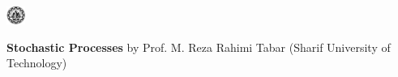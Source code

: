 \documentclass[9pt, purple]{./template/cv} %
\begin{document}
\begin{minipage}{\linewidth}
\begin{minipage}[t]{\linewidth}
    \end{minipage}

    \vspace{0.3cm}
    
    \begin{minipage}[t]{\linewidth}
    
        \begin{minipage}{1cm}
            \vspace{-\baselineskip}
            \includegraphics[width=6mm]{img/sharif}\centering
        \end{minipage}
        \begin{minipage}{0.8\linewidth}
            \vspace{-\baselineskip}
            \textcolor{text!85}{\textbf{Stochastic Processes} \space \pipe \space by Prof. M. Reza Rahimi Tabar (Sharif University of Technology)}
        \end{minipage}
    
    \end{minipage}
    
\end{minipage}


\vspace{0.5cm}
\end{document}
